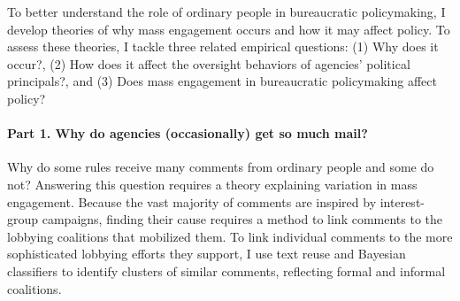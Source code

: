 To better understand the role of ordinary people in bureaucratic policymaking, 
I develop theories of why mass engagement occurs and how it may affect policy. To assess these theories, I tackle three related empirical questions: (1) Why does it occur?, (2) How does it affect the oversight behaviors of agencies' political principals?, and %
(3)  Does mass engagement in bureaucratic policymaking affect policy?

\paragraph{Part 1. Why do agencies (occasionally) get so much mail?} %
Why do some rules receive many comments from ordinary people and some do not?
Answering this question requires a theory explaining variation in mass engagement. Because the vast majority of comments are inspired by interest-group campaigns, finding their cause requires a method to link comments to the lobbying coalitions that mobilized them.  
To link individual comments to the more sophisticated lobbying efforts they support, I use text reuse and Bayesian classifiers to identify clusters of similar comments, reflecting formal and informal coalitions.
